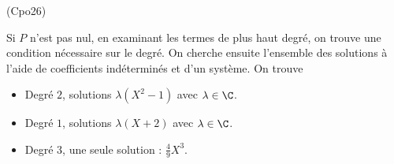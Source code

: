 \begin{tiny}(Cpo26)\end{tiny} Si $P$ n'est pas nul, en examinant les termes de plus haut degré, on trouve une condition nécessaire sur le degré. On cherche ensuite l'ensemble des solutions à l'aide de coefficients indéterminés et d'un système. On trouve
\begin{itemize}
 \item Degré $2$, solutions  $\lambda(X^2-1)$ avec $\lambda\in\C$.
 \item Degré $1$, solutions  $\lambda(X+2)$ avec $\lambda\in\C$.
 \item Degré $3$, une seule solution : $\frac{4}{9}X^3$.
\end{itemize}
